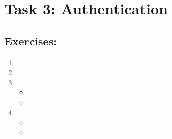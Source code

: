 \section*{Task 3: Authentication}
\subsection*{Exercises:}
\begin{enumerate}
\item
\item
\item \highergradesonly
  \begin{itemize}
    \item
    \item
  \end{itemize}
\item
  \begin{itemize}
    \item
    \item
  \end{itemize}
\end{enumerate}
